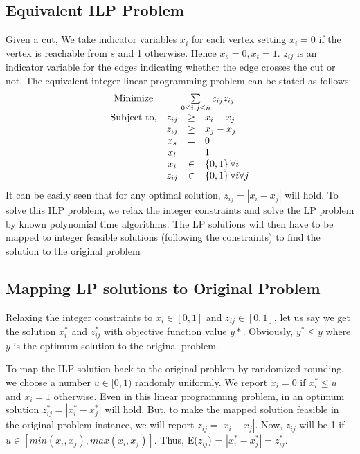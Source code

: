\subsection{Equivalent ILP Problem}
Given a cut, We take indicator variables $x_i$ for each vertex setting $x_i=0$ if the vertex is reachable from $s$ and 1 otherwise. Hence $x_s=0, x_t=1$. $z_{ij}$ is an indicator variable for the edges indicating whether the edge crosses the cut or not.
The equivalent integer linear programming problem can be stated as follows:
\[
\begin{array}{cccl}
$Minimize$ & \multicolumn{3}{c}{\sum\limits_{0\leq i,j \leq n} c_{ij}z_{ij}}\\
$Subject to,$ & z_{ij} & \geq & x_i - x_j \\
 &			z_{ij} & \geq & x_j - x_j \\
 &			x_s & = & 0 \\
 &			x_t & = & 1 \\
 &			x_i & \in & \{0,1\} \, \forall i \\
 &			z_{ij} & \in & \{0,1\} \, \forall i \forall j
\end{array}
\]
It can be easily seen that for any optimal solution, $z_{ij} = |x_i - x_j|$ will hold. To solve this ILP problem, we relax the integer constraints and solve the LP problem by known polynomial time algorithms. The LP solutions will then have to be mapped to integer feasible solutions (following the constraints) to find the solution to the original problem

\subsection{Mapping LP solutions to Original Problem}
Relaxing the integer constraints to $x_i \in [0,1]$ and $z_{ij} \in [0,1]$, let us say we get the solution $x_i^*$ and $z_{ij}^*$ with objective function value $y*$. Obviously, $y^* \leq y $ where $y$ is the optimum solution to the original problem.

To map the ILP solution back to the original problem by randomized rounding, we choose a number $u \in [0,1)$ randomly uniformly. We report $x_i = 0 $ if $x_i^* \leq u$ and $x_i = 1$ otherwise. Even in this linear programming problem, in an optimum solution $z_{ij}^* = |x_i^* - x_j^*|$ will hold. But, to make the mapped solution feasible in the original problem instance, we will report $z_{ij} = |x_i - x_j|$. Now, $z_{ij}$ will be 1 if $u \in [min(x_i,x_j), max(x_i,x_j)]$. Thus, E($z_{ij}$) = $|x_i^* - x_j^*| = z_{ij}^*$.

